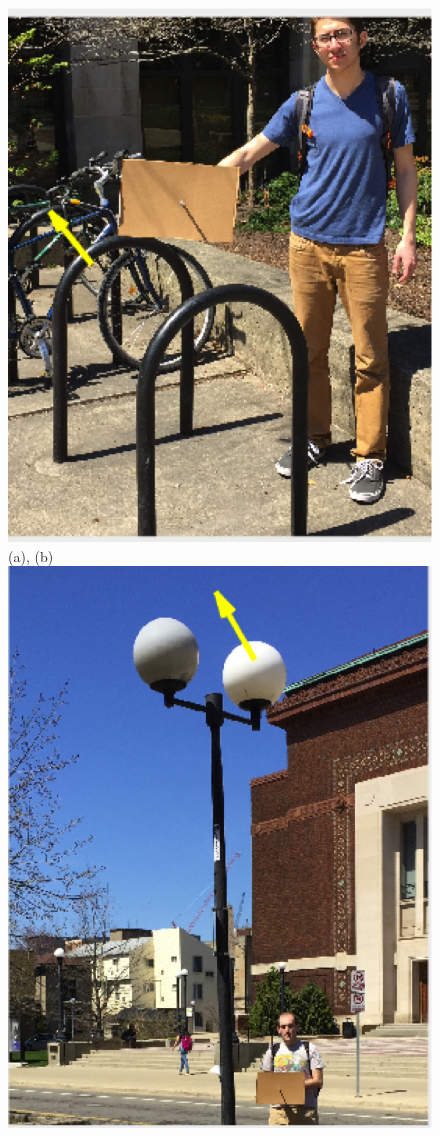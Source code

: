 \documentclass[10pt,twocolumn,letterpaper]{article}
\begin{document}
\begin{figure}[h]
\includegraphics[scale = 0.3]{zander.png}
(a), (b)\\
\includegraphics[scale = 0.3]{lamppost.png}

\end{figure}
\end{document}
